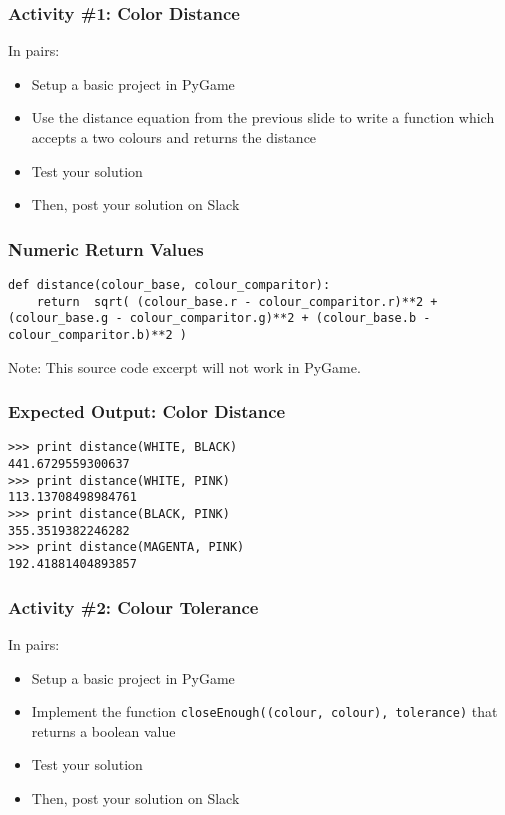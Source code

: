 \begin{frame}
	\frametitle{Activity \#1: Color Distance}
	
	In pairs:
	
	\vspace{2em}
	
	\begin{itemize}		
		\item Setup a basic project in PyGame
		\item Use the distance equation from the previous slide to write a function which accepts a two colours and returns the distance
		\item Test your solution
		\item Then, post your solution on Slack
	\end{itemize}
\end{frame}

\begin{frame}[fragile]
	\frametitle{Numeric Return Values}
	
\begin{lstlisting}
def distance(colour_base, colour_comparitor):
    return  sqrt( (colour_base.r - colour_comparitor.r)**2 + (colour_base.g - colour_comparitor.g)**2 + (colour_base.b - colour_comparitor.b)**2 )
\end{lstlisting}

Note: This source code excerpt will not work in PyGame.

\end{frame}

\begin{frame}[fragile]
	\frametitle{Expected Output: Color Distance}
	
\begin{lstlisting}
>>> print distance(WHITE, BLACK)
441.6729559300637
>>> print distance(WHITE, PINK)
113.13708498984761
>>> print distance(BLACK, PINK)
355.3519382246282
>>> print distance(MAGENTA, PINK)
192.41881404893857
\end{lstlisting}

\end{frame}

\begin{frame}
	\frametitle{Activity \#2: Colour Tolerance}
	
	In pairs:
	
	\vspace{2em}
	
	\begin{itemize}		
		\item Setup a basic project in PyGame
		\item Implement the function \texttt{closeEnough((colour, colour), tolerance)} that returns a boolean value
		\item Test your solution
		\item Then, post your solution on Slack
	\end{itemize}
\end{frame}

